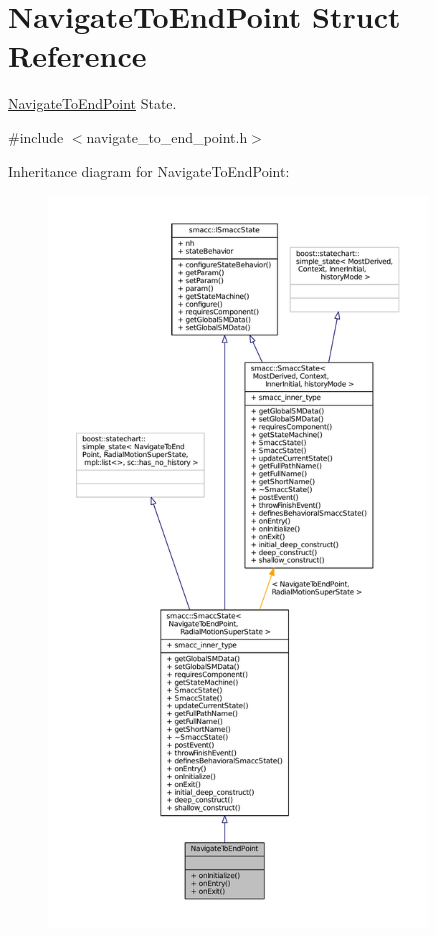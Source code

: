\hypertarget{structNavigateToEndPoint}{}\section{Navigate\+To\+End\+Point Struct Reference}
\label{structNavigateToEndPoint}


\hyperlink{structNavigateToEndPoint}{Navigate\+To\+End\+Point} State.  




{\ttfamily \#include $<$navigate\+\_\+to\+\_\+end\+\_\+point.\+h$>$}



Inheritance diagram for Navigate\+To\+End\+Point\+:
\nopagebreak
\begin{figure}[H]
\begin{center}
\leavevmode
\includegraphics[height=550pt]{structNavigateToEndPoint__inherit__graph}
\end{center}
\end{figure}


